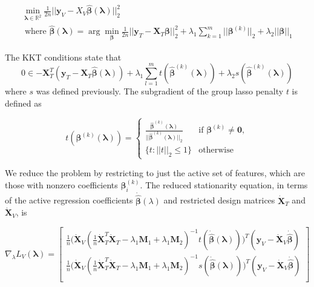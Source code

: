 \documentclass[10pt,letterpaper]{article}
\begin{document}
\begin{equation}
\begin{array}{c}
\min_{\boldsymbol{\lambda} \in \mathbb{R}^2} \frac{1}{2n} \bigl\lvert\bigl\lvert \boldsymbol{y}_V - X_V \hat{\boldsymbol{\beta}}(\boldsymbol{\lambda}) \bigl\rvert\bigl\rvert^2_2 \\
\text{ where }
\hat{\boldsymbol{\beta}}(\boldsymbol{\lambda}) = \arg\min_{\boldsymbol{\beta}} \frac{1}{2n} \bigl\lvert\bigl\lvert \boldsymbol{y}_T - \boldsymbol{X}_T \boldsymbol{\beta} \bigl\rvert\bigl\rvert^2_2
+ \lambda_1 \sum_{k=1}^m \lvert\lvert \boldsymbol\beta^{(k)} \rvert \rvert_2
+ \lambda_2 \lvert\lvert \boldsymbol\beta \rvert \rvert_1
\end{array}
\end{equation}

The KKT conditions state that
\begin{equation}
0 \in -\boldsymbol{X}_T^T(\boldsymbol{y}_T - \boldsymbol{X}_T \hat{\boldsymbol{\beta}}(\boldsymbol{\lambda}))
+ \lambda_1 \sum\limits_{l=1}^m t(\hat{\boldsymbol{\beta}}^{(k)}(\boldsymbol{\lambda}))
+ \lambda_2 s(\hat{\boldsymbol{\beta}}^{(k)}(\boldsymbol{\lambda}))
\end{equation}
where $s$ was defined previously. The subgradient of the group lasso penalty $t$ is defined as

\begin{equation}
t(\boldsymbol{\beta}^{(k)}(\boldsymbol{\lambda})) = \begin{cases}
  \frac{ \hat{\boldsymbol{\beta}}^{(k)}(\boldsymbol{\lambda})}{||\hat{\boldsymbol{\beta}}^{(k)}(\boldsymbol{\lambda}) ||_2} & \text{if } \boldsymbol\beta^{(k)} \ne \boldsymbol{0}, \\
\{t : ||t||_2 \le 1\} & \text{otherwise}
\end{cases}
\end{equation}

We reduce the problem by restricting to just the active set of features, which are those with nonzero coefficients $\boldsymbol{\beta}^{(k)}_i$. The reduced stationarity equation, in terms of the active regression coefficients $\dot{\hat{\boldsymbol{\beta}}} (\lambda)$ and restricted design matrices $\dot{\boldsymbol{X}}_T$ and $\dot{\boldsymbol{X}}_V$, is

\begin{equation}
\nabla_\lambda L_V(\boldsymbol{\lambda}) =
\begin{bmatrix}
\frac{1}{n}
\Bigg (
\dot{\boldsymbol{X}}_V
(\frac{1}{n} \dot{\boldsymbol{X}}_T^T \dot{\boldsymbol{X}}_T - \lambda_1 \boldsymbol{M}_1 + \lambda_1 \boldsymbol{M}_2)^{-1}
t(\dot{\hat{\boldsymbol{\beta}}}(\boldsymbol{\lambda}))
\Bigg )^T
(\boldsymbol{y}_V - \dot{\boldsymbol{X}}_V \dot{\hat{\boldsymbol{\beta}}})
 \\
\frac{1}{n}
\Bigg (\dot{\boldsymbol{X}}_V
(\frac{1}{n} \dot{\boldsymbol{X}}_T^T \dot{\boldsymbol{X}}_T - \lambda_1 \boldsymbol{M}_1 + \lambda_1 \boldsymbol{M}_2)^{-1}
s(\dot{\hat{\boldsymbol{\beta}}}(\boldsymbol{\lambda}))
\Bigg )^T
(\boldsymbol{y}_V - \dot{\boldsymbol{X}}_V \dot{\hat{\boldsymbol{\beta}}})
\\ 
\end{bmatrix}
\end{equation}
\end{document}
